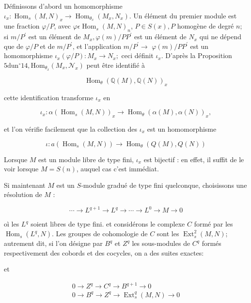 Définissons d'abord un homomorphisme $\iota_{x}: \operatorname{Hom}_{s}(M, N)_{x} \rightarrow \operatorname{Hom}_{\theta_{x}}\left(M_{x}, N_{x}\right)$. Un élément du premier module est une fraction $\varphi / P$, avec $\varphi \epsilon \operatorname{Hom}_{s}(M, N)_{n}$, $P \in S(x), P$ homogène de degré $n$; si $m / P^{\prime}$ est un élément de $M_{x}, \varphi(m) / P P^{\prime}$ est un élément de $N_{x}$ qui ne dépend que de $\varphi / P$ et de $m / P^{\prime}$, et l'application $m / P^{\prime} \rightarrow$ $\varphi(m) / P P^{\prime}$ est un homomorphisme $\iota_{x}(\varphi / P): M_{x} \rightarrow N_{x} ;$ ceci définit $\iota_{x} .$ D'après la Proposition $5 \mathrm{du} \mathrm{n}^{\circ} 14, \mathrm{Hom}_{\theta_{x}}\left(M_{x}, \mathcal{N}_{x}\right)$ peut être identifié à

$$
\operatorname{Hom}_{\mathcal{\theta}}(\mathbb{Q}(M), \mathbb{Q}(N))_{x}
$$

cette identification transforme $\iota_{x}$ en

$$
\iota_{x}: \alpha\left(\operatorname{Hom}_{s}(M, N)\right)_{x} \rightarrow \operatorname{Hom}_{\theta}(\alpha(M), \alpha(N))_{x},
$$

et l'on vérifie facilement que la collection des $\iota_{x}$ est un homomorphisme

$$
\iota: a\left(\operatorname{Hom}_{s}(M, N)\right) \rightarrow \operatorname{Hom}_{\theta}(Q(M), Q(N))
$$

Lorsque $M$ est un module libre de type fini, $\iota_{x}$ est bijectif : en effet, il suffit de le voir lorsque $M=S(n)$, auquel cas c'est immédiat.

Si maintenant $M$ est un $S$-module gradué de type fini quelconque, choisissons une résolution de $M$ :

$$
\cdots \rightarrow L^{q+1} \rightarrow L^{q} \rightarrow \cdots \rightarrow L^{0} \rightarrow M \rightarrow 0
$$

oì les $L^{q}$ soient libres de type fini. et considérons le complexe $C$ formé par les $\operatorname{Hom}_{s}\left(L^{q}, N\right)$. Les groupes de cohomologie de $C$ sont les $\operatorname{Ext}_{s}^{2}(M, N)$; autrement dit, si l'on désigne par $B^{q}$ et $Z^{q}$ les sous-modules de $C^{q}$ formés respectivement des cobords et des cocycles, on a des suites exactes:

et

$$
\begin{gathered}
    0 \rightarrow Z^{q} \rightarrow C^{q} \rightarrow B^{q+1} \rightarrow 0 \\
    0 \rightarrow B^{q} \rightarrow Z^{q} \rightarrow \operatorname{Ext}_{s}^{q}(M, N) \rightarrow 0
\end{gathered}
$$

